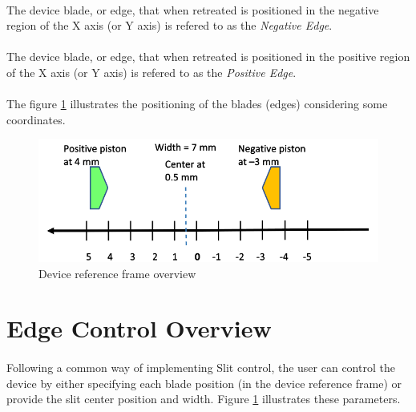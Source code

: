 \documentclass[openany]{article}
\begin{document}
    \paragraph{} The device blade, or edge, that when retreated is positioned in the negative region of the X axis (or Y axis) is refered to as the \emph{Negative Edge}.

    \paragraph{} The device blade, or edge, that when retreated is positioned in the positive region of the X axis (or Y axis) is refered to as the \emph{Positive Edge}.

    \paragraph{} The figure \ref{fig:ref-frame} illustrates the positioning of the blades (edges) considering some coordinates.

    \begin{figure}[!h]
        \caption{Device reference frame overview}
        \label{fig:ref-frame}
        \centering
        \includegraphics[width=1.0\textwidth]{diff_ctrl_ref_frame}
    \end{figure}
    \FloatBarrier

\section{Edge Control Overview}

    \paragraph{} Following a common way of implementing Slit control, the user can control the device by either specifying each blade position (in the device reference frame) or provide the slit center position and width. Figure \ref{fig:ref-frame} illustrates these parameters.
\end{document}
